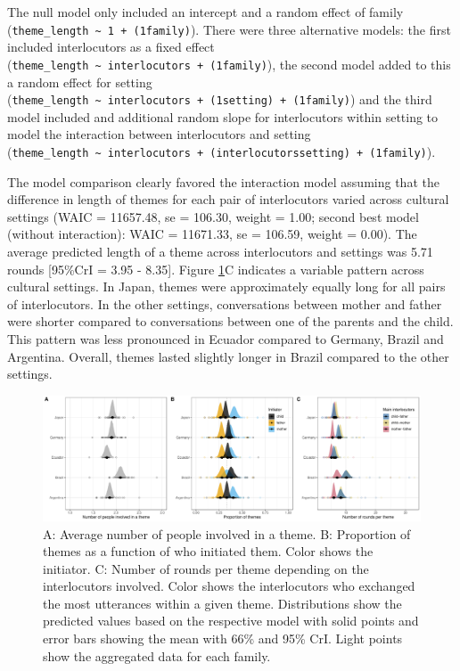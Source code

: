\documentclass[
  man,floatsintext]{apa6}
\begin{document}
The null model only included an intercept and a random effect of family (\texttt{theme\_length\ \textasciitilde{}\ 1\ +\ (1\textbar{}family)}). There were three alternative models: the first included interlocutors as a fixed effect (\texttt{theme\_length\ \textasciitilde{}\ interlocutors\ +\ (1\textbar{}family)}), the second model added to this a random effect for setting (\texttt{theme\_length\ \textasciitilde{}\ interlocutors\ +\ (1\textbar{}setting)\ +\ (1\textbar{}family)}) and the third model included and additional random slope for interlocutors within setting to model the interaction between interlocutors and setting (\texttt{theme\_length\ \textasciitilde{}\ interlocutors\ +\ (interlocutors\textbar{}setting)\ +\ (1\textbar{}family)}).

The model comparison clearly favored the interaction model assuming that the difference in length of themes for each pair of interlocutors varied across cultural settings (WAIC = 11657.48, se = 106.30, weight = 1.00; second best model (without interaction): WAIC = 11671.33, se = 106.59, weight = 0.00). The average predicted length of a theme across interlocutors and settings was 5.71 rounds {[}95\%CrI = 3.95 - 8.35{]}. Figure \ref{fig:fig3}C indicates a variable pattern across cultural settings. In Japan, themes were approximately equally long for all pairs of interlocutors. In the other settings, conversations between mother and father were shorter compared to conversations between one of the parents and the child. This pattern was less pronounced in Ecuador compared to Germany, Brazil and Argentina. Overall, themes lasted slightly longer in Brazil compared to the other settings.

\begin{figure}
\includegraphics[width=1\linewidth]{../visuals/fig3} \caption{A: Average number of people involved in a theme. B: Proportion of themes as a function of who initiated them. Color shows the initiator. C: Number of rounds per theme depending on the interlocutors involved. Color shows the interlocutors who exchanged the most utterances within a given theme. Distributions show the predicted values based on the respective model with solid points and error bars showing the mean with 66\% and 95\% CrI. Light points show the aggregated data for each family.}\label{fig:fig3}
\end{figure}
\end{document}
